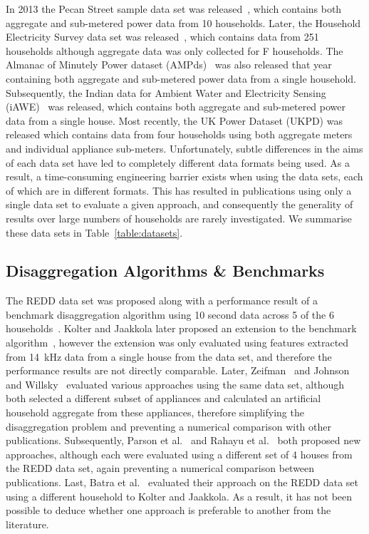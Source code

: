 \documentclass{sig-alternate}
\newcommand{\bluecolor}[1]{\textcolor{blue}{#1}}
\newcommand{\tabref}[1]{Table~\ref{#1}}
\begin{document}
In 2013 the Pecan Street sample data set was released~\cite{pecan}, which contains both aggregate and sub-metered power data from 10 households. Later, the Household Electricity Survey data set was released~\cite{hes}, which contains data from 251 households although aggregate data was only collected for F households. The Almanac of Minutely Power dataset (AMPds)~\cite{ampds} was also released that year containing both aggregate and sub-metered power data from a single household. Subsequently, the Indian data for Ambient Water and Electricity Sensing (iAWE)~\cite{iawe} was released, which contains both aggregate and sub-metered power data from a single house. Most recently, the UK Power Dataset (UKPD) \cite{ukpd} was released which contains data from four households using both aggregate meters and individual appliance sub-meters. Unfortunately, subtle differences in the aims of each data set have led to completely different data formats being used. As a result, a time-consuming engineering barrier exists when using the data sets, each of which are in different formats. This has resulted in publications using only a single data set to evaluate a given approach, and consequently the generality of results over large numbers of households are rarely investigated. We summarise these data sets in \tabref{table:datasets}.

\subsection{Disaggregation Algorithms \& Benchmarks}
\label{sec:algorithms}
\noindent The REDD data set was proposed along with a performance result of a benchmark disaggregation algorithm using 10 second data across 5 of the 6 households~\cite{redd}. Kolter and Jaakkola later proposed an extension to the benchmark algorithm~\cite{kolter_2012}, however the extension was only evaluated using features extracted from 14~kHz data from a single house from the data set, and therefore the performance results are not directly comparable. Later, Zeifman~\cite{zeifman_2012} and Johnson and Willsky~\cite{johnson_2013} evaluated various approaches using the same data set, although both selected a different subset of appliances and calculated an artificial household aggregate from these appliances, therefore simplifying the disaggregation problem and preventing a numerical comparison with other publications. Subsequently, Parson et al.~\cite{parson_2012} and Rahayu et al.~\cite{rahayu_2012} both proposed new approaches, although each were evaluated using a different set of 4 houses from the REDD data set, again preventing a numerical comparison between publications. Last, Batra et al.~\cite{batra_2013} evaluated their approach on the REDD data set using a different household to Kolter and Jaakkola. As a result, it has not been possible to deduce whether one approach is preferable to another from the literature.
\end{document}
